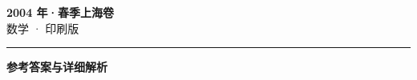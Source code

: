 \documentclass[zihao=5, a4paper]{ctexart}
\begin{document}
\begin{center}
  {\Large\bfseries 2004 年·春季上海卷}\\[4pt]
  {\large 数学 · 印刷版}
\end{center}
\medskip
{}

\par\bigskip\hrule\bigskip
{}
\begin{center}{\large\bfseries 参考答案与详细解析}\end{center}
\smallskip

\end{document}

